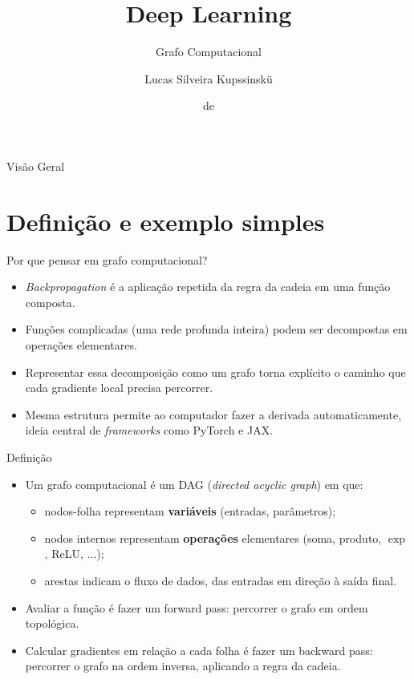 \documentclass[aspectratio=169,xcolor=dvipsnames]{beamer}
\title{Deep Learning}
\subtitle{Grafo Computacional}
\author{Lucas Silveira Kupssinskü}
\institute
{
    Machine Learning Theory and Applications Laboratory \\
    PUCRS
}
\date{\mespor de \the\year}
\begin{document}
  \begin{frame}
    \titlepage
  \end{frame}

  \begin{frame}{Visão Geral}
    \tableofcontents
  \end{frame}

  \section{Definição e exemplo simples}

  \begin{frame}{Por que pensar em grafo computacional?}
    \begin{itemize}
      \item \textit{Backpropagation} é a aplicação repetida da regra da cadeia
        em uma função composta.
      \item Funções complicadas (uma rede profunda inteira) podem ser
        decompostas em operações elementares.
      \item Representar essa decomposição como um \alert{grafo} torna
        explícito o caminho que cada gradiente local precisa percorrer.
      \item Mesma estrutura permite ao computador fazer a derivada
        \alert{automaticamente}, ideia central de \textit{frameworks}
        como PyTorch e JAX.
    \end{itemize}
  \end{frame}

  \begin{frame}{Definição}
    \begin{itemize}
      \item Um \alert{grafo computacional} é um DAG (\textit{directed acyclic graph})
        em que:
        \begin{itemize}
          \item nodos-folha representam \textbf{variáveis} (entradas, parâmetros);
          \item nodos internos representam \textbf{operações} elementares (soma,
            produto, $\exp$, ReLU, $\dots$);
          \item arestas indicam o fluxo de dados, das entradas em direção à
            saída final.
        \end{itemize}
      \item Avaliar a função é fazer um \alert{forward pass}: percorrer o grafo
        em ordem topológica.
      \item Calcular gradientes em relação a cada folha é fazer um
        \alert{backward pass}: percorrer o grafo na ordem inversa, aplicando
        a regra da cadeia.
    \end{itemize}
  \end{frame}
\end{document}
